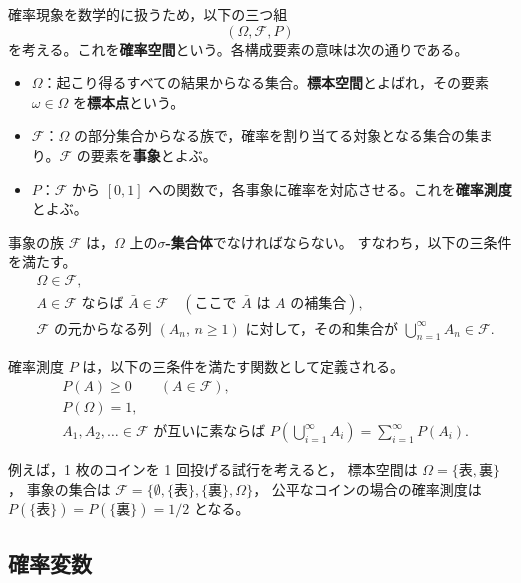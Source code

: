 \documentclass[a4j,dvipdfmx]{jsarticle}
\theoremstyle{plainnote}
\begin{document}
確率現象を数学的に扱うため，以下の三つ組
\[
  (\Omega,\mathcal{F},P)
\]
を考える。これを\textbf{確率空間}という。各構成要素の意味は次の通りである。

\begin{itemize}
  \item $\Omega$：起こり得るすべての結果からなる集合。\textbf{標本空間}とよばれ，その要素 $\omega \in \Omega$ を\textbf{標本点}という。
  \item $\mathcal{F}$：$\Omega$ の部分集合からなる族で，確率を割り当てる対象となる集合の集まり。$\mathcal{F}$ の要素を\textbf{事象}とよぶ。
  \item $P$：$\mathcal{F}$ から $[0,1]$ への関数で，各事象に確率を対応させる。これを\textbf{確率測度}とよぶ。
\end{itemize}

事象の族 $\mathcal{F}$ は，$\Omega$ 上の\textbf{$\sigma$-集合体}でなければならない。
すなわち，以下の三条件を満たす。
\begin{align}
  &\Omega\in\mathcal{F}, \label{eq:sigma_omega}\\
  &A\in\mathcal{F}\text{ ならば }\bar{A}\in\mathcal{F}
   \quad(\text{ここで }\bar{A}\text{ は }A\text{ の補集合}), \label{eq:sigma_comp}\\
  &\mathcal{F}\text{ の元からなる列 }(A_n,\,n\geq 1)\text{ に対して，その和集合が }
   \bigcup_{n=1}^{\infty}A_n\in\mathcal{F}. \label{eq:sigma_union}
\end{align}

確率測度 $P$ は，以下の三条件を満たす関数として定義される。
\begin{align}
  &P(A)\geq 0 \qquad (A\in\mathcal{F}), \label{eq:prob_nonneg}\\
  &P(\Omega)=1, \label{eq:prob_total}\\
  &A_1,A_2,\ldots \in \mathcal{F}\text{ が互いに素ならば }
   P\!\left(\bigcup_{i=1}^{\infty} A_i\right)
   =\sum_{i=1}^{\infty}P(A_i). \label{eq:prob_sigma_add}
\end{align}

例えば，1 枚のコインを 1 回投げる試行を考えると，
標本空間は $\Omega=\{\text{表},\text{裏}\}$，
事象の集合は $\mathcal{F}=\{\emptyset,\{\text{表}\},\{\text{裏}\},\Omega\}$，
公平なコインの場合の確率測度は $P(\{\text{表}\})=P(\{\text{裏}\})=1/2$ となる。

\subsection{確率変数}
\end{document}
